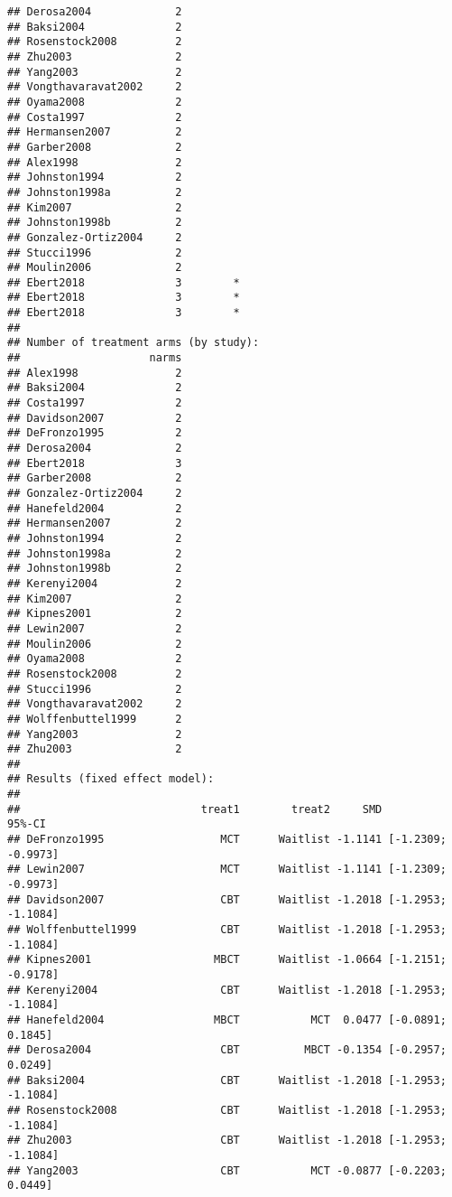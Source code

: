 \documentclass[]{book}
\theoremstyle{definition}
\theoremstyle{definition}
\theoremstyle{definition}
\theoremstyle{remark}
\begin{document}
\begin{verbatim}
## Derosa2004             2         
## Baksi2004              2         
## Rosenstock2008         2         
## Zhu2003                2         
## Yang2003               2         
## Vongthavaravat2002     2         
## Oyama2008              2         
## Costa1997              2         
## Hermansen2007          2         
## Garber2008             2         
## Alex1998               2         
## Johnston1994           2         
## Johnston1998a          2         
## Kim2007                2         
## Johnston1998b          2         
## Gonzalez-Ortiz2004     2         
## Stucci1996             2         
## Moulin2006             2         
## Ebert2018              3        *
## Ebert2018              3        *
## Ebert2018              3        *
## 
## Number of treatment arms (by study):
##                    narms
## Alex1998               2
## Baksi2004              2
## Costa1997              2
## Davidson2007           2
## DeFronzo1995           2
## Derosa2004             2
## Ebert2018              3
## Garber2008             2
## Gonzalez-Ortiz2004     2
## Hanefeld2004           2
## Hermansen2007          2
## Johnston1994           2
## Johnston1998a          2
## Johnston1998b          2
## Kerenyi2004            2
## Kim2007                2
## Kipnes2001             2
## Lewin2007              2
## Moulin2006             2
## Oyama2008              2
## Rosenstock2008         2
## Stucci1996             2
## Vongthavaravat2002     2
## Wolffenbuttel1999      2
## Yang2003               2
## Zhu2003                2
## 
## Results (fixed effect model):
## 
##                            treat1        treat2     SMD             95%-CI
## DeFronzo1995                  MCT      Waitlist -1.1141 [-1.2309; -0.9973]
## Lewin2007                     MCT      Waitlist -1.1141 [-1.2309; -0.9973]
## Davidson2007                  CBT      Waitlist -1.2018 [-1.2953; -1.1084]
## Wolffenbuttel1999             CBT      Waitlist -1.2018 [-1.2953; -1.1084]
## Kipnes2001                   MBCT      Waitlist -1.0664 [-1.2151; -0.9178]
## Kerenyi2004                   CBT      Waitlist -1.2018 [-1.2953; -1.1084]
## Hanefeld2004                 MBCT           MCT  0.0477 [-0.0891;  0.1845]
## Derosa2004                    CBT          MBCT -0.1354 [-0.2957;  0.0249]
## Baksi2004                     CBT      Waitlist -1.2018 [-1.2953; -1.1084]
## Rosenstock2008                CBT      Waitlist -1.2018 [-1.2953; -1.1084]
## Zhu2003                       CBT      Waitlist -1.2018 [-1.2953; -1.1084]
## Yang2003                      CBT           MCT -0.0877 [-0.2203;  0.0449]

\end{verbatim}
\end{document}
